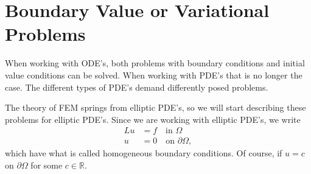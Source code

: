 \section{Boundary Value or Variational Problems}
When working with ODE's, both problems with boundary conditions 
and initial value conditions can be solved. When working with 
PDE's that is no longer the case. The different types 
of PDE's demand differently posed problems. 

The theory of FEM springs from elliptic PDE's, so we will start 
describing these problems for elliptic PDE's. Since we are working with 
elliptic PDE's, we write
\begin{align*}
    Lu &= f \quad \text{in } \Omega \\
    u &= 0 \quad \text{on } \partial \Omega,
\end{align*}
which have what is called homogeneous boundary conditions. Of course, 
if $u=c$ on $\partial \Omega$ for some $c \in \mathbb{R}$.